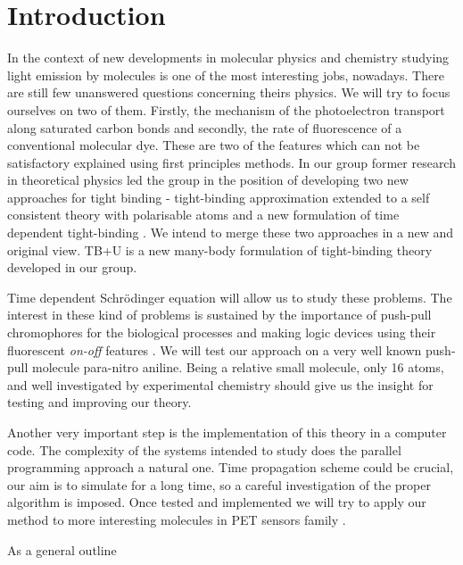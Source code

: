 \cleardoublepage
{}
{}
\chapter*{Introduction}
%
%
\par{In the context of new developments in molecular physics and chemistry studying
light emission by molecules is one of the most interesting jobs,
nowadays. There are still few unanswered questions concerning theirs
physics. We will try to focus ourselves on two of them. Firstly, the mechanism
of the photoelectron transport along saturated carbon bonds and secondly, the
rate of fluorescence of a conventional molecular dye. These are two of the
features which can not be satisfactory explained using first principles
methods. In our group former research in theoretical physics led the group in
the position of developing two new approaches for tight binding -
tight-binding approximation extended  to a self consistent theory with
polarisable atoms \citep{Finnis98} and a new formulation of time dependent tight-binding
\citep{Todorov01}. We intend to merge these two approaches in a new and original view. TB+U
is a new many-body formulation of tight-binding theory developed in our
group.}
\par{Time dependent Schr{\"o}dinger equation will allow us to study these
problems. The interest in these kind of problems is sustained by the
importance of push-pull chromophores for the biological processes \citep{deSilva01} and
making logic devices using their fluorescent \emph{on-off} features \citep{deSilva01}. We will
test our approach on a very well known push-pull molecule
para-nitro aniline. Being a relative small molecule, only 16 atoms, and well
investigated by experimental chemistry should give us the insight for testing
and improving our theory.}
\par{Another very important step is the implementation of this theory in a computer
code. The complexity of the systems intended to study does the parallel
programming approach a natural one. Time propagation scheme could be crucial,
our aim is to simulate for a long time, so a careful investigation of the
proper algorithm is imposed. Once tested and implemented we will try to apply
our method to more interesting molecules in PET sensors family \citep{deSilva01b}.}
\par{As a general outline}
